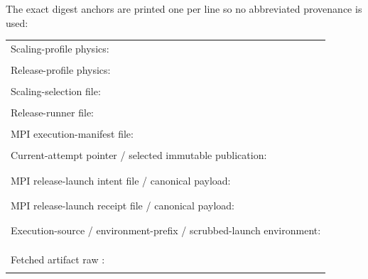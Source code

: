 \documentclass[11pt]{article}
\newcommand{\code}[1]{\texttt{\detokenize{#1}}}
\renewcommand{\_}{\OriginalTextUnderscore\allowbreak}
\begin{document}
The exact digest anchors are printed one per line so no abbreviated provenance
is used:
\begin{center}
\begin{tabular}{@{}l@{}}
Scaling-profile physics: \\[-1mm]
\quad{\scriptsize\texttt{\MPIScalingPhysicsSHA}} \\[1mm]
Release-profile physics: \\[-1mm]
\quad{\scriptsize\texttt{\MPIReleasePhysicsSHA}} \\[1mm]
Scaling-selection file: \\[-1mm]
\quad{\scriptsize\texttt{\MPIScalingManifestSHA}} \\[1mm]
Release-runner file: \\[-1mm]
\quad{\scriptsize\texttt{\MPIRunnerManifestSHA}} \\[1mm]
MPI execution-manifest file: \\[-1mm]
\quad{\scriptsize\texttt{\MPIExecutionManifestSHA}} \\[1mm]
Current-attempt pointer / selected immutable publication: \\[-1mm]
\quad{\scriptsize\texttt{\CurrentAttemptSHA}} \\[-1mm]
\quad{\scriptsize\texttt{\AttemptPublicationSHA}} \\[1mm]
MPI release-launch intent file / canonical payload: \\[-1mm]
\quad{\scriptsize\texttt{\MPIReleaseLaunchIntentSHA}} \\[-1mm]
\quad{\scriptsize\texttt{\MPIReleaseLaunchIntentPayloadSHA}} \\[1mm]
MPI release-launch receipt file / canonical payload: \\[-1mm]
\quad{\scriptsize\texttt{\MPIReleaseLaunchSHA}} \\[-1mm]
\quad{\scriptsize\texttt{\MPIReleaseLaunchPayloadSHA}} \\[1mm]
Execution-source / environment-prefix / scrubbed-launch environment: \\[-1mm]
\quad{\scriptsize\texttt{\MPIExecutionSourceIdentitySHA}} \\[-1mm]
\quad{\scriptsize\texttt{\MPIEnvironmentPrefixManifestSHA}} \\[-1mm]
\quad{\scriptsize\texttt{\MPILaunchEnvironmentSHA}} \\[1mm]
Fetched artifact raw \code{SHA256SUMS}: \\[-1mm]
\quad{\scriptsize\texttt{\ArtifactChecksumManifestSHA}} \\[1mm]

\end{tabular}
\end{center}
\end{document}
